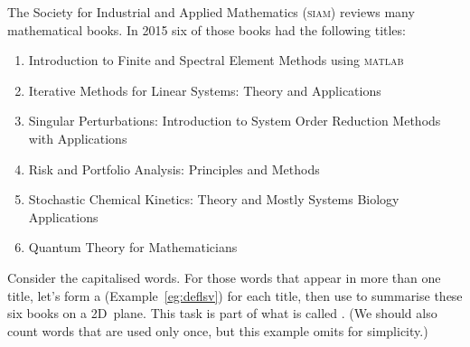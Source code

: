 The Society for Industrial and Applied Mathematics (\textsc{siam}) reviews many mathematical books.
In 2015 six of those books had the following titles:
\begin{enumerate}
\item Introduction to Finite and Spectral Element Methods using \textsc{matlab}
\item Iterative Methods for Linear Systems: Theory and Applications 
\item Singular Perturbations: Introduction to System Order Reduction Methods with Applications 
\item Risk and Portfolio Analysis: Principles and Methods 
\item Stochastic Chemical Kinetics: Theory and Mostly Systems Biology Applications
\item Quantum Theory for Mathematicians 
\end{enumerate}
Consider the capitalised words. 
For those words that appear in more than one title, let's form a  (Example~\ref{eg:deflsv}) for each title, then use  to summarise these six books on a 2D~plane.
This task is part of what is called  \cite[]{Berry95}.  
(We should also count words that are used only once, but this example omits for simplicity.)


